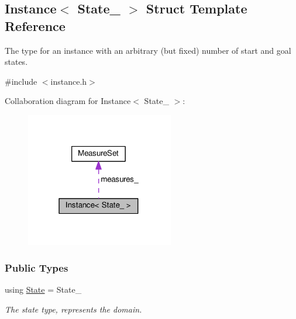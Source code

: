 \hypertarget{structInstance}{}\subsection{Instance$<$ State\+\_\+ $>$ Struct Template Reference}
\label{structInstance}


The type for an instance with an arbitrary (but fixed) number of start and goal states.  




{\ttfamily \#include $<$instance.\+h$>$}



Collaboration diagram for Instance$<$ State\+\_\+ $>$\+:\nopagebreak
\begin{figure}[H]
\begin{center}
\leavevmode
\includegraphics[width=183pt]{structInstance__coll__graph}
\end{center}
\end{figure}
\subsubsection*{Public Types}
\begin{DoxyCompactItemize}
\item 
using \hyperlink{structInstance_a464461e0e371f5f3af9e228751ed265e}{State} = State\+\_\+\hypertarget{structInstance_a464461e0e371f5f3af9e228751ed265e}{}\label{structInstance_a464461e0e371f5f3af9e228751ed265e}

\begin{DoxyCompactList}\small\item\em The state type, represents the domain. \end{DoxyCompactList}\end{DoxyCompactItemize}
